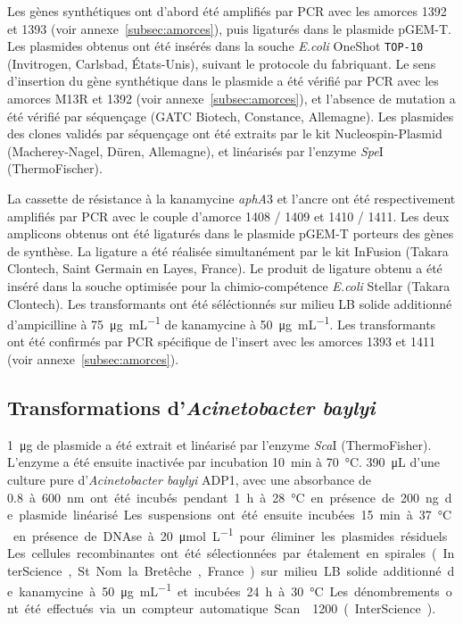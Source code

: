 Les gènes synthétiques ont d'abord été amplifiés par PCR avec les amorces 1392
et 1393 (voir annexe~\ref{subsec:amorces}), puis ligaturés dans le plasmide
pGEM-T. Les plasmides obtenus ont été insérés dans la souche \emph{E.coli}
OneShot\textsuperscript{{\textregistered}} \texttt{TOP-10} (Invitrogen,
Carlsbad, États-Unis), suivant le protocole du fabriquant. Le sens d'insertion
du gène synthétique dans le plasmide a été vérifié par PCR avec les amorces M13R
et 1392 (voir annexe~\ref{subsec:amorces}), et l'absence de mutation a été
vérifié par séquençage (GATC Biotech, Constance, Allemagne). Les plasmides des
clones validés par séquençage ont été extraits par le kit Nucleospin-Plasmid
(Macherey-Nagel, Düren, Allemagne), et linéarisés par l'enzyme \emph{Spe}I
(ThermoFischer).

La cassette de résistance à la kanamycine \emph{aphA}3 et l'ancre ont été
respectivement amplifiés par PCR avec le couple d'amorce 1408 / 1409 et 1410 /
1411. Les deux amplicons obtenus ont été ligaturés dans le plasmide pGEM-T
porteurs des gènes de synthèse. La ligature a été réalisée simultanément par le
kit InFusion (Takara Clontech, Saint Germain en Layes, France). Le produit de
ligature obtenu a été inséré dans la souche optimisée pour la chimio-compétence
\emph{E.coli} Stellar (Takara Clontech). Les transformants ont été séléctionnés
sur milieu LB solide additionné d'ampicilline à \SI{75}{\ug\per\mL} de
kanamycine à \SI{50}{\ug\per\mL}. Les transformants ont été confirmés par PCR
spécifique de l'insert avec les amorces 1393 et 1411 (voir
annexe~\ref{subsec:amorces}).

\subsection{Transformations d'\emph{Acinetobacter baylyi}}
\label{subsec:transfo}

\SI{1}{\ug} de plasmide a été extrait et linéarisé par l'enzyme \emph{Sca}I
(ThermoFisher). L'enzyme a été ensuite inactivée par incubation \SI{10}{\minute}
à \SI{70}{\celsius}. \SI{390}{\uL} d'une culture pure d'\emph{Acinetobacter
  baylyi} ADP1, avec une absorbance de \SI{0,8} à \SI{600}{\nm} ont été incubés
pendant \SI{1}{\hour} à \SI{28}{\celsius} en présence de \SI{200}{\ng} de
plasmide linéarisé. Les suspensions ont été ensuite incubées \SI{15}{\minute} à
\SI{37}{\celsius} en présence de DNAse à \SI{20}{\umol\per\L} pour éliminer les
plasmides résiduels. Les cellules recombinantes ont été sélectionnées par
étalement en spirales (InterScience, St Nom la Bretêche, France) sur milieu LB
solide additionné de kanamycine à \SI{50}{\ug\per\mL} et incubées \SI{24}{\hour}
à \SI{30}{\celsius}. Les dénombrements ont été effectués via un compteur
automatique Scan\textsuperscript{\textregistered}1200 (InterScience).

